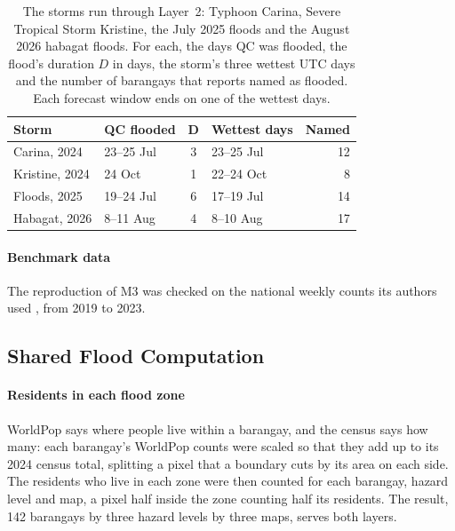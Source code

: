 \begin{table}[t]
\centering\footnotesize
\setlength{\tabcolsep}{4pt}
\caption{The storms run through Layer~2: Typhoon Carina, Severe Tropical Storm Kristine, the
July 2025 floods and the August 2026 habagat floods. For each, the days QC was flooded, the
flood's duration $D$ in days, the storm's three wettest UTC days and the number of barangays
that reports named as flooded. Each forecast window ends on one of the wettest
days.}\label{tab:storms}
\begin{tabular}{@{}l l c l r@{}}
\toprule
\textbf{Storm} & \textbf{QC flooded} & $\boldsymbol{D}$ & \textbf{Wettest days} & \textbf{Named} \\
\midrule
Carina, 2024   & 23--25 Jul & 3 & 23--25 Jul & 12 \\
Kristine, 2024 & 24 Oct     & 1 & 22--24 Oct &  8 \\
Floods, 2025   & 19--24 Jul & 6 & 17--19 Jul & 14 \\
Habagat, 2026  & 8--11 Aug  & 4 & 8--10 Aug  & 17 \\
\bottomrule
\end{tabular}
\end{table}

\paragraph{Benchmark data}
The reproduction of M3 was checked on the national weekly counts its authors used
\parencite{parreno2023}, from 2019 to 2023.

\subsection{Shared Flood Computation}\label{sec:flood}

\paragraph{Residents in each flood zone}
WorldPop says where people live within a barangay, and the census says how many: each barangay's
WorldPop counts were scaled so that they add up to its 2024 census total, splitting a pixel that
a boundary cuts by its area on each side. The residents who live in each zone were then counted
for each barangay, hazard level and map, a pixel half inside the zone counting half its
residents.
The result, 142 barangays by three hazard levels by three maps, serves both layers.

